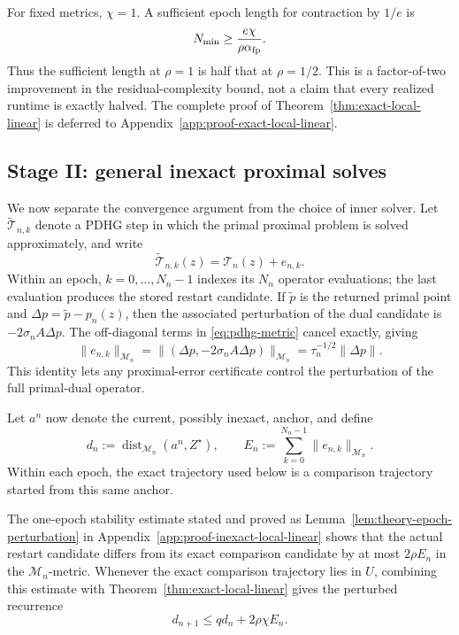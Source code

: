 \documentclass[letterpaper]{article} %
\theoremstyle{definition}
\theoremstyle{remark}
\begin{document}
For fixed metrics, $\chi=1$.  A sufficient epoch length for contraction by
$1/e$ is
\[
    N_{\min}
    \ge
    \frac{e\chi}{\rho\alpha_{\rm fp}}.
\]
Thus the sufficient length at $\rho=1$ is half that at $\rho=1/2$.  This is a
factor-of-two improvement in the residual-complexity bound, not a claim that
every realized runtime is exactly halved.  The complete proof of
Theorem~\ref{thm:exact-local-linear} is deferred to
Appendix~\ref{app:proof-exact-local-linear}.

\subsection{Stage II: general inexact proximal solves}

We now separate the convergence argument from the choice of inner solver.
Let $\widetilde{\mathcal T}_{n,k}$ denote a PDHG step in which the primal
proximal problem is solved approximately, and write
\begin{equation}
\label{eq:operator-error}
    \widetilde{\mathcal T}_{n,k}(z)
    =
    \mathcal T_n(z)+e_{n,k}.
\end{equation}
Within an epoch, $k=0,\ldots,N_n-1$ indexes its $N_n$ operator evaluations;
the last evaluation produces the stored restart candidate.  If
$\widetilde p$ is the returned primal point and
$\Delta p=\widetilde p-p_n(z)$, then the associated perturbation of the dual
candidate is $-2\sigma_nA\Delta p$.  The off-diagonal terms in
\eqref{eq:pdhg-metric} cancel exactly, giving
\begin{equation}
\label{eq:prox-error-to-operator-error}
    \|e_{n,k}\|_{\mathcal M_n}
    =
    \|(\Delta p,-2\sigma_nA\Delta p)\|_{\mathcal M_n}
    =
    \tau_n^{-1/2}\|\Delta p\|.
\end{equation}
This identity lets any proximal-error certificate control the perturbation of
the full primal-dual operator.

Let $a^n$ now denote the current, possibly inexact, anchor, and define
\begin{equation}
\label{eq:aggregate-operator-error}
    d_n
    :=
    \operatorname{dist}_{\mathcal M_n}(a^n,Z^\star),
    \qquad
    E_n
    :=
    \sum_{k=0}^{N_n-1}\|e_{n,k}\|_{\mathcal M_n}.
\end{equation}
Within each epoch, the exact trajectory used below is a comparison trajectory
started from this same anchor.

\edef\epochperturbationnumber{\thetheorem}
The one-epoch stability estimate stated and proved as
Lemma~\ref{lem:theory-epoch-perturbation} in
Appendix~\ref{app:proof-inexact-local-linear} shows that the actual restart
candidate differs from its exact comparison candidate by at most
$2\rho E_n$ in the $\mathcal M_n$-metric.  Whenever the exact comparison
trajectory lies in $U$, combining this estimate with
Theorem~\ref{thm:exact-local-linear} gives the perturbed recurrence
\begin{equation}
\label{eq:inexact-recurrence}
    d_{n+1}
    \le
    qd_n+2\rho\chi E_n.
\end{equation}
\end{document}
